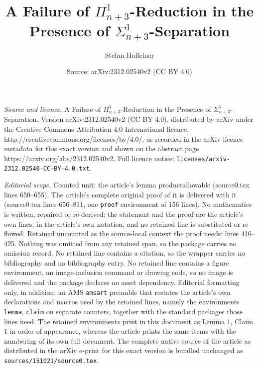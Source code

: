 \documentclass[10pt,a4paper]{amsart}
\title{A Failure of $\Pi^1_{n+3}$-Reduction in the Presence of $\Sigma^1_{n+3}$-Separation}
\author{Stefan Hoffelner}
\date{Source: arXiv:2312.02540v2 (CC BY 4.0)}
\begin{document}
\maketitle

\noindent\emph{Source and licence.} A Failure of $\Pi^1_{n+3}$-Reduction in the Presence of $\Sigma^1_{n+3}$-Separation. Version arXiv:2312.02540v2 (CC BY 4.0), distributed by arXiv under the Creative Commons Attribution 4.0 International licence, http://creativecommons.org/licenses/by/4.0/, as recorded in the arXiv licence metadata for this exact version and shown on the abstract page https://arxiv.org/abs/2312.02540v2. Full licence notice: \texttt{licenses/arxiv-2312.02540-CC-BY-4.0.txt}.\par\smallskip

\noindent\textit{Editorial scope.} Counted unit: the article's lemma productallowable (source0.tex lines 650--655). The article's complete original proof of it is delivered with it (source0.tex lines 656--811, one \texttt{proof} environment of 156 lines). No mathematics is written, repaired or re-derived: the statement and the proof are the article's own lines, in the article's own notation, and no retained line is substituted or re-flowed.  Retained uncounted as the source-local context the proof needs: lines 416--425.  Nothing was omitted from any retained span, so the package carries no omission record.  No retained line contains a citation, so the wrapper carries no bibliography and no bibliography entry.  No retained line contains a figure environment, an image-inclusion command or drawing code, so no image is delivered and the package declares no asset dependency.  Editorial formatting only, in addition: an AMS \texttt{amsart} preamble that restates the article's own declarations and macros used by the retained lines, namely the environments \texttt{lemma}, \texttt{claim} on separate counters, together with the standard packages those lines need.  The retained environments print in this document as Lemma 1, Claim 1 in order of appearance, whereas the article prints the same items with the numbering of its own full document.  The complete native source of the article as distributed in the arXiv e-print for this exact version is bundled unchanged as \texttt{sources/151021/source0.tex}.
\end{document}
